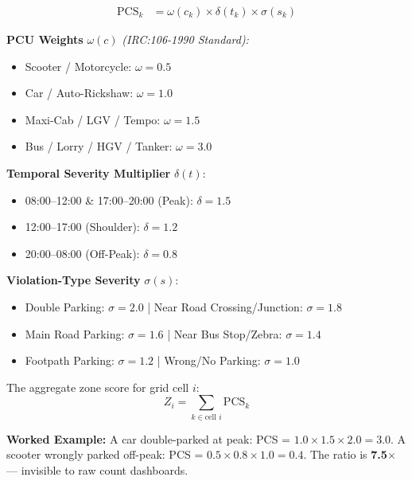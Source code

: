 \documentclass[12pt,a4paper]{article}
\begin{document}
\begin{tcolorbox}[formulabox]
\begin{align}
    \text{PCS}_k &= \omega(c_k) \times \delta(t_k) \times \sigma(s_k) \label{eq:pcs}
\end{align}

\noindent\textbf{PCU Weights} $\omega(c)$ \textit{(IRC:106-1990 Standard):}
\begin{itemize}[leftmargin=2em, itemsep=2pt]
    \item Scooter / Motorcycle: $\omega = 0.5$
    \item Car / Auto-Rickshaw: $\omega = 1.0$
    \item Maxi-Cab / LGV / Tempo: $\omega = 1.5$
    \item Bus / Lorry / HGV / Tanker: $\omega = 3.0$
\end{itemize}

\noindent\textbf{Temporal Severity Multiplier} $\delta(t)$:
\begin{itemize}[leftmargin=2em, itemsep=2pt]
    \item 08:00--12:00 \& 17:00--20:00 (Peak): $\delta = 1.5$
    \item 12:00--17:00 (Shoulder): $\delta = 1.2$
    \item 20:00--08:00 (Off-Peak): $\delta = 0.8$
\end{itemize}

\noindent\textbf{Violation-Type Severity} $\sigma(s)$:
\begin{itemize}[leftmargin=2em, itemsep=2pt]
    \item Double Parking: $\sigma = 2.0$ \quad | \quad Near Road Crossing/Junction: $\sigma = 1.8$
    \item Main Road Parking: $\sigma = 1.6$ \quad | \quad Near Bus Stop/Zebra: $\sigma = 1.4$
    \item Footpath Parking: $\sigma = 1.2$ \quad | \quad Wrong/No Parking: $\sigma = 1.0$
\end{itemize}

\noindent The aggregate zone score for grid cell $i$:
\begin{equation}
    Z_i = \sum_{k \in \text{cell } i} \text{PCS}_k
    \label{eq:zi}
\end{equation}
\end{tcolorbox}

\textbf{Worked Example:} A car double-parked at peak: PCS = $1.0 \times 1.5 \times 2.0 = 3.0$. A scooter wrongly parked off-peak: PCS = $0.5 \times 0.8 \times 1.0 = 0.4$. The ratio is \textbf{7.5$\times$} — invisible to raw count dashboards.
\end{document}
